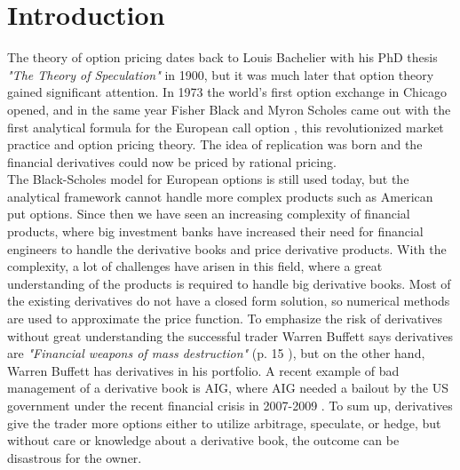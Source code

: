 
\chapter{Introduction} %

\label{Chapter1} %

The theory of option pricing dates back to Louis Bachelier with his PhD thesis \textsl{"The Theory of Speculation"} in 1900, but it was much later that option theory gained significant attention. In 1973 the world's first option exchange in Chicago opened, and in the same year Fisher Black and Myron Scholes came out with the first analytical formula for the European call option \parencite{B-S-Paper}, this revolutionized market practice and option pricing theory. The idea of replication was born and the financial derivatives could now be priced by rational pricing. \\

The Black-Scholes model for European options is still used today, but the analytical framework cannot handle more complex products such as American put options. Since then we have seen an increasing complexity of financial products, where big investment banks have increased their need for financial engineers to handle the derivative books and price derivative products. With the complexity, a lot of challenges have arisen in this field, where a great understanding of the products is required to handle big derivative books. Most of the existing derivatives do not have a closed form solution, so numerical methods are used to approximate the price function. To emphasize the risk of derivatives without great understanding the successful trader Warren Buffett says derivatives are \textsl{"Financial weapons of mass destruction"} (p. 15 \parencite{Buffett02}), but on the other hand, Warren Buffett has derivatives in his portfolio. A recent example of bad management of a derivative book is AIG, where AIG needed a bailout by the US government under the recent financial crisis in  2007-2009 \parencite{McDonaldRobert2015}. To sum up, derivatives give the trader more options either to utilize arbitrage, speculate, or hedge, but without care or knowledge about a derivative book, the outcome can be disastrous for the owner.\\

